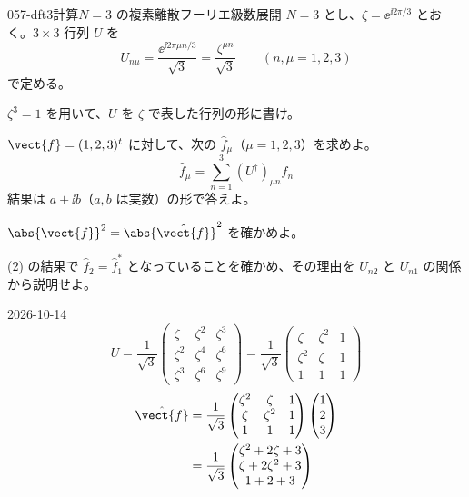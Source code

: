 \documentclass[uplatex,dvipdfmx,a4paper,11pt]{jsarticle}
\begin{document}
\mondaihen
{}
\begin{mondai}{057-dft3}{計算}{$N=3$ の複素離散フーリエ級数展開}
$N=3$ とし、$\zeta=\ee^{\ii 2\pi/3}$ とおく。$3\times3$ 行列 $U$ を
\[
U_{n\mu}=\frac{\ee^{\ii 2\pi\mu n/3}}{\sqrt{3}}=\frac{\zeta^{\mu n}}{\sqrt{3}}\qquad(n,\mu=1,2,3)
\]
で定める。
\begin{shoumon}
  \item $\zeta^{3}=1$ を用いて、$U$ を $\zeta$ で表した行列の形に書け。
  \item $\vect{f}=(1,2,3)^{t}$ に対して、次の $\hat{f}_{\mu}$（$\mu=1,2,3$）を求めよ。
\[
\hat{f}_{\mu}=\sum_{n=1}^{3}(U^{\dagger})_{\mu n}f_n
\]
結果は $a+\ii b$（$a,b$ は実数）の形で答えよ。
  \item $\abs{\vect{f}}^{2}=\abs{\hat{\vect{f}}}^{2}$ を確かめよ。
  \item (2) の結果で $\hat{f}_2=\hat{f}_1^{*}$ となっていることを確かめ、その理由を $U_{n2}$ と $U_{n1}$ の関係から説明せよ。
\end{shoumon}
\begin{kotaeutsushi}{2026-10-14}
\[
  U=\frac{1}{\sqrt{3}}\left(\begin{smallmatrix}\zeta&\zeta^{2}&\zeta^{3}\\\zeta^{2}&\zeta^{4}&\zeta^{6}\\\zeta^{3}&\zeta^{6}&\zeta^{9}\end{smallmatrix}\right)
  =\frac{1}{\sqrt{3}}\left(\begin{smallmatrix}\zeta&\zeta^{2}&1\\\zeta^{2}&\zeta&1\\1&1&1\end{smallmatrix}\right)
\]
\begin{align*}
  \hat{\vect{f}}&=\frac{1}{\sqrt{3}}\begin{pmatrix}\zeta^{2}&\zeta&1\\\zeta&\zeta^{2}&1\\1&1&1\end{pmatrix}\begin{pmatrix}1\\2\\3\end{pmatrix}\\
  &=\frac{1}{\sqrt{3}}\begin{pmatrix}\zeta^{2}+2\zeta+3\\\zeta+2\zeta^{2}+3\\1+2+3\end{pmatrix}

\end{align*}
\end{kotaeutsushi}
\end{mondai}
\end{document}
